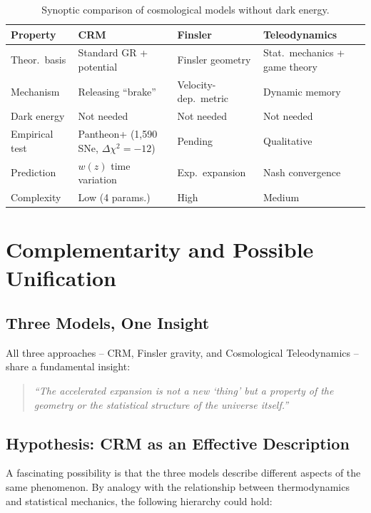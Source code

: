 \documentclass[aps,prd,twocolumn,superscriptaddress,nofootinbib]{revtex4-2}
\begin{document}
\begin{table}[htbp]
\centering
\caption{Synoptic comparison of cosmological models without dark energy.}
\label{tab:synopse}
\begin{tabular}{llll}
\toprule
\textbf{Property} & \textbf{CRM} & \textbf{Finsler} & \textbf{Teleodynamics} \\
\midrule
Theor.\ basis & Standard GR + potential & Finsler geometry & Stat.\ mechanics + game theory \\
Mechanism & Releasing ``brake'' & Velocity-dep.\ metric & Dynamic memory \\
Dark energy & Not needed & Not needed & Not needed \\
Empirical test & Pantheon+ (1,590 SNe, $\Delta\chi^2{=}{-}12$) & Pending & Qualitative \\
Prediction & $w(z)$ time variation & Exp.\ expansion & Nash convergence \\
Complexity & Low (4 params.) & High & Medium \\
\bottomrule
\end{tabular}
\end{table}


\section{Complementarity and Possible Unification}
\label{sec:complementarity}

\subsection{Three Models, One Insight}

All three approaches -- CRM, Finsler gravity, and Cosmological Teleodynamics -- share a fundamental insight:
\begin{quote}
\textit{``The accelerated expansion is not a new `thing' but a property of the geometry or the statistical structure of the universe itself.''}
\end{quote}

\subsection{Hypothesis: CRM as an Effective Description}

A fascinating possibility is that the three models describe different aspects of the same phenomenon. By analogy with the relationship between thermodynamics and statistical mechanics, the following hierarchy could hold:
\end{document}
